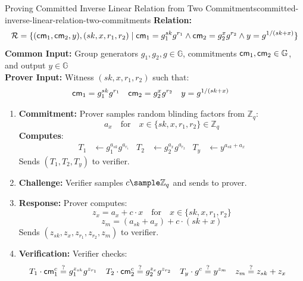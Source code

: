 \begin{protocol}{Proving Committed Inverse Linear Relation from Two Commitments}{committed-inverse-linear-relation-two-commitments}\label{pok-committed-inverse-linear-relation-two-commitments}
\textbf{Relation: }
\[
\mathcal{R} = \{(\mathsf{cm}_1, \mathsf{cm}_2, y), (sk, x, r_1, r_2) \mid \mathsf{cm}_1 = g_1^{sk} g^{r_1} \wedge \mathsf{cm}_2 = g_2^{x} g^{r_2} \wedge y = g^{1/(sk + x)}\}
\]
\textbf{Common Input:} Group generators $g_1, g_2, g \in \mathbb{G}$, commitments $\mathsf{cm}_1, \mathsf{cm}_2 \in \mathbb{G}$, and output $y \in \mathbb{G}$\\
\textbf{Prover Input:} Witness $(sk, x, r_1, r_2)$ such that:
    \begin{align*}
        \mathsf{cm}_1 &= g_1^{sk} g^{r_1} & \mathsf{cm}_2 &= g_2^{x} g^{r_2} & y &= g^{1/(sk + x)}
    \end{align*}
\begin{enumerate}
    \item \textbf{Commitment:} Prover samples random blinding factors from $\mathbb{Z}_q$:
       \[
        a_x \quad \text{for} \quad x \in \{ sk, x, r_1, r_2 \} \in \mathbb{Z}_q
       \]
    \textbf{Computes}:
    \begin{align*}
        T_1 &\gets g_1^{a_{sk}} g^{a_{r_1}} & T_2 &\gets g_2^{a_x} g^{a_{r_2}} & T_y &\gets y^{a_{sk} + a_x}
    \end{align*}
    Sends $(T_1, T_2, T_y)$ to verifier.
    
    \item \textbf{Challenge:} Verifier samples $c \sample \mathbb{Z}_q$ and sends to prover.
    
    \item \textbf{Response:} Prover computes:
    \[
    z_x = a_x + c \cdot x \quad \text{for} \quad x \in \{ sk, x, r_1, r_2 \}
    \]
    \[
    z_m = (a_{sk} + a_x) + c \cdot (sk + x)
    \]
    Sends $(z_{sk}, z_x, z_{r_1}, z_{r_2}, z_m)$ to verifier.
    
    \item \textbf{Verification:} Verifier checks:
    \begin{align*}
        T_1 \cdot \mathsf{cm}_1^c &\stackrel{?}{=} g_1^{z_{sk}} g^{z_{r_1}} &
        T_2 \cdot \mathsf{cm}_2^c &\stackrel{?}{=} g_2^{z_x} g^{z_{r_2}} &
        T_y \cdot g^c &\stackrel{?}{=} y^{z_m} &
        z_m &\stackrel{?}{=} z_{sk} + z_x
    \end{align*}
\end{enumerate}
\end{protocol}






